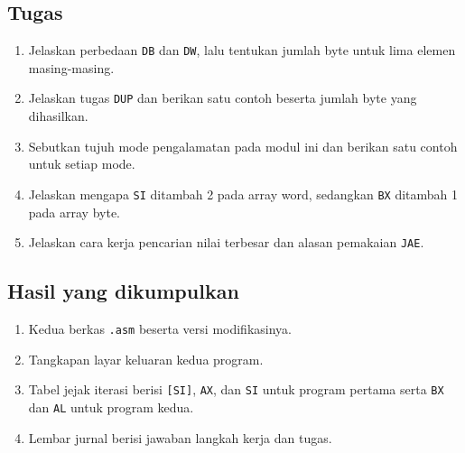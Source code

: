 \subsection{Tugas}

\begin{enumerate}
    \item Jelaskan perbedaan \texttt{DB} dan \texttt{DW}, lalu
          tentukan jumlah byte untuk lima elemen masing-masing.
    \item Jelaskan tugas \texttt{DUP} dan berikan satu contoh beserta
          jumlah byte yang dihasilkan.
    \item Sebutkan tujuh mode pengalamatan pada modul ini dan berikan
          satu contoh untuk setiap mode.
    \item Jelaskan mengapa \texttt{SI} ditambah 2 pada array word,
          sedangkan \texttt{BX} ditambah 1 pada array byte.
    \item Jelaskan cara kerja pencarian nilai terbesar dan alasan
          pemakaian \texttt{JAE}.
\end{enumerate}

\subsection{Hasil yang dikumpulkan}

\begin{enumerate}
    \item Kedua berkas \texttt{.asm} beserta versi modifikasinya.
    \item Tangkapan layar keluaran kedua program.
    \item Tabel jejak iterasi berisi \texttt{[SI]}, \texttt{AX}, dan
          \texttt{SI} untuk program pertama serta \texttt{BX} dan
          \texttt{AL} untuk program kedua.
    \item Lembar jurnal berisi jawaban langkah kerja dan tugas.
\end{enumerate}
